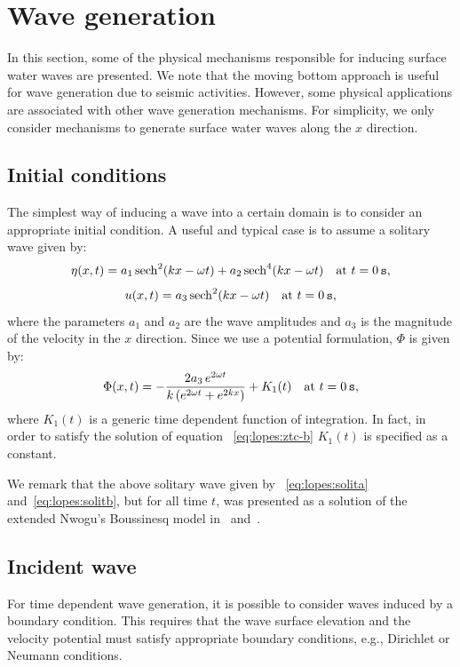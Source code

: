 \section{Wave generation}\label{sec:lopes:wavegeneration}
In this section, some of the physical mechanisms responsible
for inducing surface water waves are presented.  We note
that the moving bottom approach is useful for wave
generation due to seismic activities. However, some physical
applications are associated with other wave generation
mechanisms.  For simplicity, we only consider mechanisms to
generate surface water waves along the $x$ direction.

\subsection{Initial conditions}
The simplest way of inducing a wave into a certain domain is
to consider an appropriate initial condition. A useful and
typical case is to assume a solitary wave given by:
\begin{equation}\label{eq:lopes:solita}
\eta(x,t)=a_1\,{\rm sech}^2(kx -\omega t)+a_2\,{\rm
  sech}^4(kx-\omega t)\quad {\rm at\,\,} t=0\,{\tt s},
\end{equation}
\begin{equation}\label{eq:lopes:solitb}
u(x,t)=a_3\,{\rm sech}^2(k x-\omega t) \quad {\rm at\,\,}
t=0\,{\tt s},
\end{equation}
where the parameters $a_1$ and $a_2$ are the wave amplitudes
and $a_3$ is the magnitude of the velocity in the $x$
direction.  Since we use a potential formulation, $\Phi$ is
given by:
\begin{equation}\label{eq:lopes:solitp}
\Phi(x,t)=-\frac{2a_3\,e^{2\omega t }}{k\,(e^{2\omega t
  }+e^{2k x})}+ K_1(t) \quad {\rm at\,\,} t=0\,{\tt s},
\end{equation}
where $K_1(t)$ is a generic time dependent function of
integration.
In fact, in order to satisfy the solution of equation
~\eqref{eq:lopes:ztc-b} $K_1(t)$ is specified as a constant.

We remark that the above solitary wave given by
~\eqref{eq:lopes:solita} and~\eqref{eq:lopes:solitb}, but
for all time $t$, was presented as a solution of the
extended Nwogu's Boussinesq model in~\citet{Walkley1999}
and~\citet{WeiKirby1995}.

\subsection{Incident wave}
For time dependent wave generation, it is possible to
consider waves induced by a boundary condition.  This
requires that the wave surface elevation and the velocity
potential must satisfy appropriate boundary conditions,
e.g., Dirichlet or Neumann conditions.

